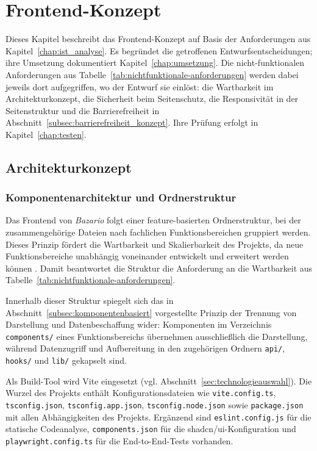 \chapter{Frontend-Konzept}
\label{chap:konzept}

Dieses Kapitel beschreibt das Frontend-Konzept auf Basis der
Anforderungen aus Kapitel~\ref{chap:ist_analyse}. Es begründet die
getroffenen Entwurfsentscheidungen; ihre Umsetzung dokumentiert
Kapitel~\ref{chap:umsetzung}. Die nicht-funktionalen Anforderungen aus
Tabelle~\ref{tab:nichtfunktionale-anforderungen} werden dabei jeweils
dort aufgegriffen, wo der Entwurf sie einlöst: die Wartbarkeit im
Architekturkonzept, die Sicherheit beim Seitenschutz, die
Responsivität in der Seitenstruktur und die Barrierefreiheit in
Abschnitt~\ref{subsec:barrierefreiheit_konzept}. Ihre Prüfung erfolgt
in Kapitel~\ref{chap:testen}.


\section{Architekturkonzept}
\label{sec:architekturkonzept}

\subsection{Komponentenarchitektur und Ordnerstruktur}
\label{subsec:komponentenarchitektur}

Das Frontend von \textit{Bazario} folgt einer feature-basierten
Ordnerstruktur, bei der zusammengehörige Dateien nach fachlichen
Funktionsbereichen gruppiert werden. Dieses Prinzip fördert die
Wartbarkeit und Skalierbarkeit des Projekts, da neue
Funktionsbereiche unabhängig voneinander entwickelt und erweitert
werden können \cite{ijlrp_react_components}. Damit beantwortet die
Struktur die Anforderung an die Wartbarkeit aus
Tabelle~\ref{tab:nichtfunktionale-anforderungen}.

Innerhalb dieser Struktur spiegelt sich das in
Abschnitt~\ref{subsec:komponentenbasiert} vorgestellte Prinzip der
Trennung von Darstellung und Datenbeschaffung wider: Komponenten im
Verzeichnis \texttt{components/} eines Funktionsbereichs übernehmen
ausschließlich die Darstellung, während Datenzugriff und Aufbereitung
in den zugehörigen Ordnern \texttt{api/}, \texttt{hooks/} und
\texttt{lib/} gekapselt sind.

Als Build-Tool wird Vite eingesetzt (vgl.
Abschnitt~\ref{sec:technologieauswahl}). Die Wurzel des Projekts
enthält Konfigurationsdateien wie \texttt{vite.config.ts},
\texttt{tsconfig.json}, \texttt{tsconfig.app.json},
\texttt{tsconfig.node.json} sowie \texttt{package.json} mit allen
Abhängigkeiten des Projekts. Ergänzend sind \texttt{eslint.config.js}
für die statische Codeanalyse, \texttt{components.json} für die
shadcn/ui-Konfiguration und \texttt{playwright.config.ts} für die
End-to-End-Tests vorhanden.

